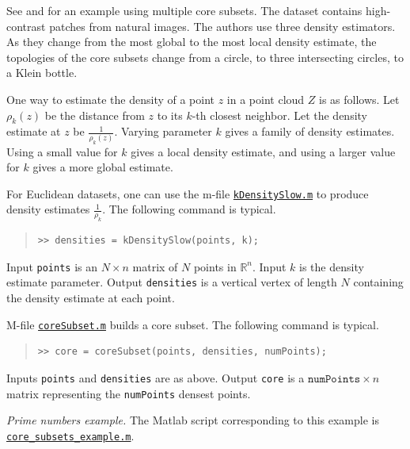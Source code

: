\documentclass[amscd, amssymb, verbatim]{amsart}[12pt]
\theoremstyle{remark}
\theoremstyle{remark}
\theoremstyle{remark}
\newcommand{\R}{\mathbb{R}}
\begin{document}
See \citet{KleinBottle} and \citet{WitnessComplexes} for an example using multiple core subsets. The dataset contains high-contrast patches from natural images. The authors use three density estimators. As they change from the most global to the most local density estimate, the topologies of the core subsets change from a circle, to three intersecting circles, to a Klein bottle. 

One way to estimate the density of a point $z$ in a point cloud $Z$ is as follows. Let $\rho_k(z)$ be the distance from $z$ to its $k$-th closest neighbor. Let the density estimate at $z$ be $\frac{1}{\rho_k(z)}$. Varying parameter $k$ gives a family of density estimates. Using a small value for $k$ gives a local density estimate, and using a larger value for $k$ gives a more global estimate. 

For Euclidean datasets, one can use the m-file \href{https://github.com/appliedtopology/javaplex/tree/master/src/matlab/for_distribution/tutorial_examples/kDensitySlow.m}{\texttt{kDensitySlow.m}} to produce density estimates $\frac{1}{\rho_k}$. The following command is typical.

\begin{quote} \begin{verbatim}
>> densities = kDensitySlow(points, k); 
\end{verbatim} \end{quote}

Input \texttt{points} is an $N\times n$ matrix of $N$ points in $\R^n$. Input $k$ is the density estimate parameter. Output \texttt{densities} is a vertical vertex of length $N$ containing the density estimate at each point. 

M-file \href{https://github.com/appliedtopology/javaplex/tree/master/src/matlab/for_distribution/tutorial_examples/coreSubset.m}{\texttt{coreSubset.m}} builds a core subset. The following command is typical.

\begin{quote} \begin{verbatim}
>> core = coreSubset(points, densities, numPoints); 
\end{verbatim} \end{quote}

Inputs \texttt{points} and \texttt{densities} are as above. Output \texttt{core} is a $\texttt{numPoints}\times n$ matrix representing the \texttt{numPoints} densest points. 

{\em Prime numbers example.} The Matlab script corresponding to this example is \href{https://github.com/appliedtopology/javaplex/tree/master/src/matlab/for_distribution/tutorial_examples/core_subsets_example.m}{\texttt{core\_subsets\_example.m}}.
\end{document}
